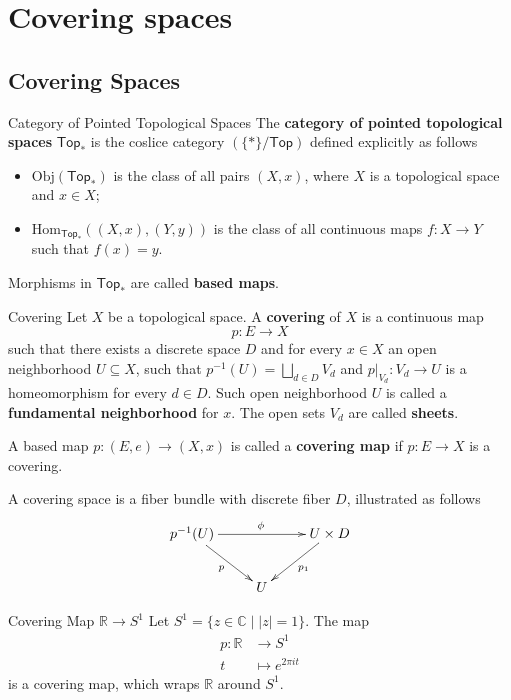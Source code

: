 \documentclass{report}
\newcommand{\Top}{\mathsf{Top}}
\newcommand{\Obj}{\mathrm{Obj}}
\newcommand{\Hom}{\mathrm{Hom}}
\begin{document}
\chapter{Covering spaces}
\section{Covering Spaces}

\begin{definition}{Category of Pointed Topological Spaces}{}
	The \textbf{category of pointed topological spaces} $\Top_*$ is the coslice category $\left(\{*\}/\Top\right)$ defined explicitly as follows
	\begin{itemize}
		\item $\Obj(\Top_*)$ is the class of all pairs $(X,x)$, where $X$ is a topological space and $x\in X$;
		\item $\Hom_{\Top_*}((X,x),(Y,y))$ is the class of all continuous maps $f:X\to Y$ such that $f(x)=y$.
	\end{itemize}
	Morphisms in $\Top_*$ are called \textbf{based maps}.
\end{definition}

\begin{definition}{Covering}{}
	Let $X$ be a topological space. A \textbf{covering} of $X$ is a continuous map
	$$
		p: E \longrightarrow X
	$$
	such that there exists a discrete space $D$ and for every $x \in X$ an open neighborhood $U \subseteq X$, such that $p^{-1}(U)=\bigsqcup_{d \in D} V_d$ and $\left.p\right|_{V_d}: V_d \rightarrow U$ is a homeomorphism for every $d \in D$. Such open neighborhood $U$ is called a \textbf{fundamental neighborhood} for $x$. The open sets $V_d$ are called \textbf{sheets}.
\end{definition}

A based map $p:(E,e)\to (X,x)$ is called a \textbf{covering map} if $p:E\to X$ is a covering.

A covering space is a fiber bundle with discrete fiber $D$, illustrated as follows
\[\xymatrix{
		p^{-1}(U)\ar[rd]_{p}\ar[rr]^{\phi}  & &U\times D\ar[ld]^{p_1}\\
		&U&
	}\]

\begin{example}{Covering Map $\mathbb{R}\to S^1$}{}
	Let $S^1=\{z\in\mathbb{C}\mid |z|=1\}$. The map
	\begin{align*}
		p:\mathbb{R} & \longrightarrow S^1      \\
		t            & \longmapsto e^{2\pi i t}
	\end{align*}
	is a covering map, which wraps $\mathbb{R}$ around $S^1$.
\end{example}
\end{document}
